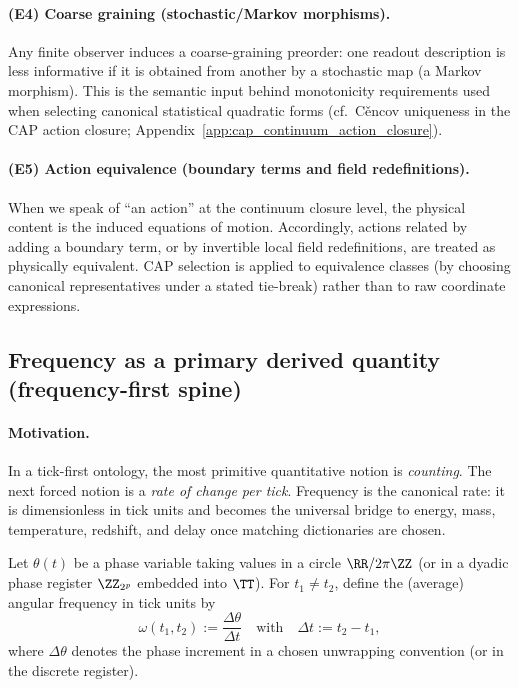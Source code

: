 \paragraph{(E4) Coarse graining (stochastic/Markov morphisms).}
\InterfaceTag Any finite observer induces a coarse-graining preorder: one readout description is less informative if it is obtained from another by a stochastic map (a Markov morphism).
This is the semantic input behind monotonicity requirements used when selecting canonical statistical quadratic forms (cf.\ C{\v{e}}ncov uniqueness in the CAP action closure; Appendix~\ref{app:cap_continuum_action_closure}).

\paragraph{(E5) Action equivalence (boundary terms and field redefinitions).}
\InterfaceTag When we speak of ``an action'' at the continuum closure level, the physical content is the induced equations of motion.
Accordingly, actions related by adding a boundary term, or by invertible local field redefinitions, are treated as physically equivalent.
CAP selection is applied to equivalence classes (by choosing canonical representatives under a stated tie-break) rather than to raw coordinate expressions.

\subsection{Frequency as a primary derived quantity (frequency-first spine)}
\label{subsec:frequency_first_spine}

\paragraph{Motivation.}
\InterfaceTag In a tick-first ontology, the most primitive quantitative notion is \emph{counting}.
The next forced notion is a \emph{rate of change per tick}.
Frequency is the canonical rate: it is dimensionless in tick units and becomes the universal bridge to energy, mass, temperature, redshift, and delay once matching dictionaries are chosen.

\begin{definition}
\label{def:frequency_from_phase}
Let $\theta(t)$ be a phase variable taking values in a circle $\RR/2\pi\ZZ$ (or in a dyadic phase register $\ZZ_{2^p}$ embedded into $\TT$).
For $t_1\neq t_2$, define the (average) angular frequency in tick units by
\[
\omega(t_1,t_2):=\frac{\Delta\theta}{\Delta t}
\quad\text{with}\quad
\Delta t:=t_2-t_1,
\]
where $\Delta\theta$ denotes the phase increment in a chosen unwrapping convention (or in the discrete register).
\end{definition}

